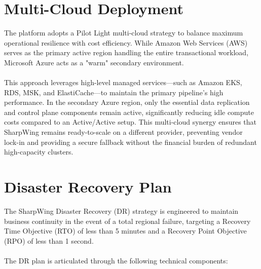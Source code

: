 \documentclass[12pt]{report}
\begin{document}
\section{Multi-Cloud Deployment}
The platform adopts a Pilot Light multi-cloud strategy to balance maximum operational resilience with cost efficiency. While Amazon Web Services (AWS) serves as the primary active region handling the entire transactional workload, Microsoft Azure acts as a "warm" secondary environment.\\\\
This approach leverages high-level managed services—such as Amazon EKS, RDS, MSK, and ElastiCache—to maintain the primary pipeline's high performance. In the secondary Azure region, only the essential data replication and control plane components remain active, significantly reducing idle compute costs compared to an Active/Active setup. This multi-cloud synergy ensures that SharpWing remains ready-to-scale on a different provider, preventing vendor lock-in and providing a secure fallback without the financial burden of redundant high-capacity clusters.

\section{Disaster Recovery Plan}
The SharpWing Disaster Recovery (DR) strategy is engineered to maintain business continuity in the event of a total regional failure, targeting a Recovery Time Objective (RTO) of less than 5 minutes and a Recovery Point Objective (RPO) of less than 1 second.\\\\
The DR plan is articulated through the following technical components:
\end{document}
